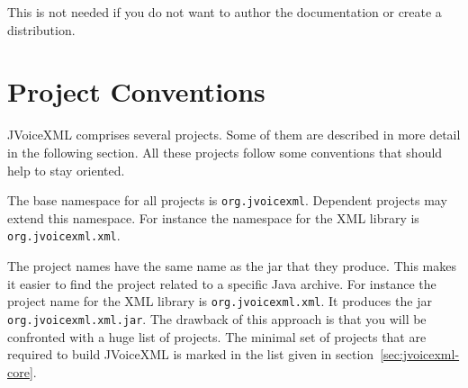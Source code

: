 \documentclass[11pt,a4paper]{article}
\begin{document}
This is not needed if you do not want to author the documentation or create a
distribution.

\section{Project Conventions}

JVoiceXML comprises several projects. Some of them are described in more
detail in the following section. All these projects follow some conventions
that should help to stay oriented.

The base namespace for all projects is \lstinline{org.jvoicexml}. Dependent 
projects may extend this namespace. For instance the namespace for the
XML library is \lstinline{org.jvoicexml.xml}.

The project names have the same name as the jar that they produce. This
makes it easier to find the project related to a specific Java archive.
For instance the project name for the XML library is
\lstinline{org.jvoicexml.xml}. It produces the jar
\texttt{org.jvoicexml.xml.jar}.
The drawback of this approach is that you will be confronted 
with a huge list of projects. The minimal set of projects
that are required to build JVoiceXML is marked in the list
given in section~\ref{sec:jvoicexml-core}.
\end{document}
